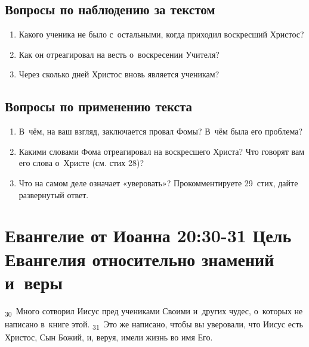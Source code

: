 \documentclass[a4paper,12pt]{article}
\begin{document}
\subsection*{Вопросы по наблюдению за текстом}
\begin{enumerate}
    \item Какого ученика не было с~остальными, когда приходил воскресший Христос? 
    
    \myline
    
    \myline
    \item Как он отреагировал на весть о~воскресении Учителя? 
    
    \myline
    
    \myline
    \item Через сколько дней Христос вновь является ученикам? 
    
    \myline
    
    \myline
\end{enumerate}

\subsection*{Вопросы по применению текста} 
\begin{enumerate}
    \item В~чём, на ваш взгляд, заключается провал Фомы? В~чём была его проблема?
    
    \myline
    
    \myline
    \item Какими словами Фома отреагировал на воскресшего Христа? Что говорят вам его слова о~Христе (см. стих 28)? 
    
    \myline
    
    \myline
    \item Что на самом деле означает «уверовать»? Прокомментируете 29~стих, дайте развернутый ответ.
    
    \myline
    
    \myline
\end{enumerate}



\section{Евангелие от Иоанна 20:30-31 Цель Евангелия относительно знамений и~веры}

\textsubscript{30}~Много сотворил Иисус пред учениками Своими и~других чудес, о~которых не написано в~книге этой. \textsubscript{31}~Это же написано, чтобы вы уверовали, что Иисус есть Христос, Сын Божий, и, веруя, имели жизнь во имя Его. 
\end{document}
